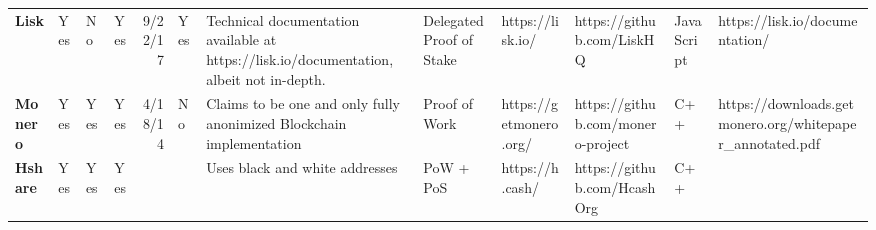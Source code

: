 \begin{table}[htbp]
\begin{adjustbox}{width=25cm, height=6cm, angle=270}
\begin{tabular}{llllrlp{17.915em}rlrrr}
      \rowcolor[rgb]{ .267,  .447,  .769} \textcolor[rgb]{ 1,  1,  1}{\textbf{Lisk}} & \cellcolor[rgb]{ .776,  .937,  .808}\textcolor[rgb]{ 0,  .38,  0}{Yes} & \cellcolor[rgb]{ 1,  .78,  .808}\textcolor[rgb]{ .612,  0,  .024}{No} & \cellcolor[rgb]{ .776,  .937,  .808}\textcolor[rgb]{ 0,  .38,  0}{Yes} & \cellcolor[rgb]{ 1,  1,  1}9/22/17 & \cellcolor[rgb]{ .776,  .937,  .808}\textcolor[rgb]{ 0,  .38,  0}{Yes} & \cellcolor[rgb]{ .851,  .882,  .949}\textcolor[rgb]{ .188,  .329,  .588}{Technical documentation available at https://lisk.io/documentation, albeit not in-depth.} & \multicolumn{1}{l}{\cellcolor[rgb]{ .851,  .882,  .949}\textcolor[rgb]{ .188,  .329,  .588}{Delegated Proof of Stake}} & \cellcolor[rgb]{ 1,  1,  1}https://lisk.io/ & \multicolumn{1}{l}{\cellcolor[rgb]{ 1,  1,  1}https://github.com/LiskHQ} & \multicolumn{1}{l}{\cellcolor[rgb]{ .851,  .882,  .949}\textcolor[rgb]{ .188,  .329,  .588}{JavaScript}} & \multicolumn{1}{l}{\cellcolor[rgb]{ 1,  1,  1}https://lisk.io/documentation/} \\
      \rowcolor[rgb]{ .267,  .447,  .769} \textcolor[rgb]{ 1,  1,  1}{\textbf{Monero}} & \cellcolor[rgb]{ .776,  .937,  .808}\textcolor[rgb]{ 0,  .38,  0}{Yes} & \cellcolor[rgb]{ .776,  .937,  .808}\textcolor[rgb]{ 0,  .38,  0}{Yes} & \cellcolor[rgb]{ .776,  .937,  .808}\textcolor[rgb]{ 0,  .38,  0}{Yes} & \cellcolor[rgb]{ .851,  .882,  .949}\textcolor[rgb]{ .188,  .329,  .588}{4/18/14} & \cellcolor[rgb]{ 1,  .78,  .808}\textcolor[rgb]{ .612,  0,  .024}{No} & \cellcolor[rgb]{ 1,  1,  1}\textcolor[rgb]{ .188,  .329,  .588}{Claims to be one and only fully anonimized Blockchain implementation} & \multicolumn{1}{l}{\cellcolor[rgb]{ .851,  .882,  .949}\textcolor[rgb]{ .188,  .329,  .588}{Proof of Work}} & \cellcolor[rgb]{ .851,  .882,  .949}\textcolor[rgb]{ .188,  .329,  .588}{https://getmonero.org/} & \multicolumn{1}{l}{\cellcolor[rgb]{ .851,  .882,  .949}\textcolor[rgb]{ .188,  .329,  .588}{https://github.com/monero-project}} & \multicolumn{1}{l}{\cellcolor[rgb]{ .851,  .882,  .949}\textcolor[rgb]{ .188,  .329,  .588}{C++}} & \multicolumn{1}{l}{\cellcolor[rgb]{ .851,  .882,  .949}\textcolor[rgb]{ .188,  .329,  .588}{https://downloads.getmonero.org/whitepaper\_annotated.pdf}} \\
      \rowcolor[rgb]{ .267,  .447,  .769} \textcolor[rgb]{ 1,  1,  1}{\textbf{Hshare}} & \cellcolor[rgb]{ .776,  .937,  .808}\textcolor[rgb]{ 0,  .38,  0}{Yes} & \cellcolor[rgb]{ .776,  .937,  .808}\textcolor[rgb]{ 0,  .38,  0}{Yes} & \cellcolor[rgb]{ .776,  .937,  .808}\textcolor[rgb]{ 0,  .38,  0}{Yes} & \cellcolor[rgb]{ 1,  1,  1} & \cellcolor[rgb]{ 1,  1,  1} & \cellcolor[rgb]{ .851,  .882,  .949}\textcolor[rgb]{ .188,  .329,  .588}{Uses black and white addresses} & \multicolumn{1}{l}{\cellcolor[rgb]{ .851,  .882,  .949}\textcolor[rgb]{ .188,  .329,  .588}{PoW + PoS}} & \cellcolor[rgb]{ 1,  1,  1}https://h.cash/ & \multicolumn{1}{l}{\cellcolor[rgb]{ 1,  1,  1}https://github.com/HcashOrg} & \multicolumn{1}{l}{\cellcolor[rgb]{ .851,  .882,  .949}\textcolor[rgb]{ .188,  .329,  .588}{C++}} & \cellcolor[rgb]{ 1,  1,  1} \\

\end{tabular}
\end{adjustbox}
\end{table}
